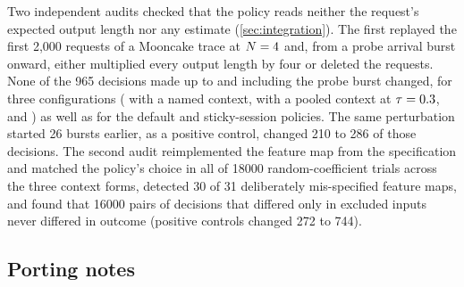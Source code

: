Two independent audits checked that the policy reads neither the request's expected output length
nor any \ais{} estimate (\cref{sec:integration}).
The first replayed the first 2,000 requests of a Mooncake trace at $N = 4$ and, from a probe
arrival burst onward, either multiplied every output length by four or deleted the requests.
None of the 965 decisions made up to and including the probe burst changed, for three \lc{}
configurations ( with a named context,  with a pooled context at $\tau = 0.3$,
and ) as well as for the default and sticky-session policies. The same perturbation
started 26 bursts earlier, as a positive control, changed 210 to 286 of those decisions.
The second audit reimplemented the feature map from the specification and matched the policy's
choice in all of \num{18000} random-coefficient trials across the three context forms, detected 30
of 31 deliberately mis-specified feature maps, and found that \num{16000} pairs of decisions that
differed only in excluded inputs never differed in outcome (positive controls changed 272 to 744).

\subsection{Porting notes}

